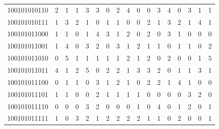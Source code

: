 \documentclass[10pt,a4paper]{article}
\begin{document}
\begin{longtable}{ |c|c|c|c|c|c|c|c|c|c|c|c|c|c|c|c|c| }
    100101010110              & 2                            & 1                                & 1                            & 3                              & 3   & 0   & 2   & 4   & 0   & 0   & 3   & 4   & 0   & 3   & 1   & 1   \\
    100101010111              & 1                            & 3                                & 2                            & 1                              & 0   & 1   & 1   & 0   & 0   & 2   & 1   & 3   & 2   & 1   & 4   & 1   \\
    100101011000              & 1                            & 1                                & 0                            & 1                              & 4   & 3   & 1   & 2   & 0   & 2   & 0   & 3   & 1   & 0   & 0   & 0   \\
    100101011001              & 1                            & 4                                & 0                            & 3                              & 2   & 0   & 3   & 1   & 2   & 1   & 1   & 0   & 1   & 1   & 0   & 2   \\
    100101011010              & 0                            & 5                                & 1                            & 1                              & 1   & 1   & 1   & 2   & 1   & 2   & 0   & 2   & 0   & 0   & 1   & 5   \\
    100101011011              & 4                            & 1                                & 2                            & 5                              & 0   & 2   & 2   & 1   & 3   & 3   & 2   & 0   & 1   & 1   & 3   & 1   \\
    100101011100              & 0                            & 1                                & 1                            & 0                              & 3   & 1   & 2   & 1   & 0   & 2   & 2   & 1   & 4   & 1   & 0   & 0   \\
    100101011101              & 1                            & 1                                & 0                            & 0                              & 2   & 1   & 1   & 1   & 1   & 0   & 0   & 0   & 0   & 3   & 2   & 0   \\
    100101011110              & 0                            & 0                                & 0                            & 3                              & 2   & 0   & 0   & 0   & 1   & 0   & 4   & 0   & 1   & 2   & 0   & 1   \\
    100101011111              & 1                            & 0                                & 3                            & 2                              & 1   & 2   & 2   & 2   & 2   & 1   & 1   & 0   & 2   & 0   & 0   & 1   \\

\end{longtable}
\end{document}
